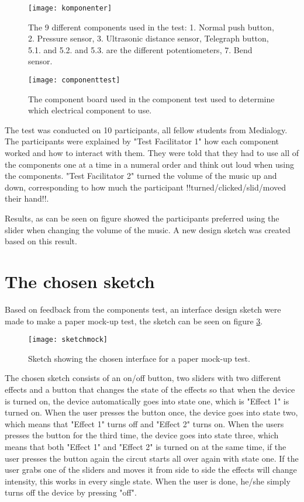 \begin{figure}[!h] 
\centering
\texttt{[image: komponenter]}
\caption{\label{fig:komponenter} The 9 different components used in the test: 1. Normal push button, 2. Pressure sensor, 3. Ultrasonic distance sensor, Telegraph button, 5.1. and 5.2. and 5.3. are the different potentiometers, 7. Bend sensor.}
\end{figure}

\begin{figure}[!h] 
\centering
\texttt{[image: componenttest]}
\caption{\label{fig:componenttest} The component board used in the component test used to determine which electrical component to use.}
\end{figure}

The test was conducted on 10 participants, all fellow students from Medialogy. The participants were explained by "Test Facilitator 1" how each component worked and how to interact with them. They were told that they had to use all of the components one at a time in a numeral order and think out loud when using the components. "Test Facilitator 2" turned the volume of the music up and down, corresponding to how much the participant !!turned/clicked/slid/moved their hand!!.

Results, as can be seen on figure  showed the participants preferred using the slider when changing the volume of the music. A new design sketch was created based on this result.


\section{The chosen sketch}
Based on feedback from the components test, an interface design sketch were made to make a paper mock-up test, the sketch can be seen on figure \ref{fig:sketchmock}. 

\begin{figure}[!h] 
\centering
\texttt{[image: sketchmock]}
\caption{\label{fig:sketchmock} Sketch showing the chosen interface for a paper mock-up test.}
\end{figure}

The chosen sketch consists of an on/off button, two sliders with two different effects and a button that changes the state of the effects so that when the device is turned on, the device automatically goes into state one, which is "Effect 1" is turned on. When the user presses the button once, the device goes into state two, which means that "Effect 1" turns off and "Effect 2" turns on. When the users presses the button for the third time, the device goes into state three, which means that both "Effect 1" and "Effect 2" is turned on at the same time, if the user presses the button again the circut starts all over again with state one. If the user grabs one of the sliders and moves it from side to side the effects will change intensity, this works in every single state. When the user is done, he/she simply turns off the device by pressing "off". 

